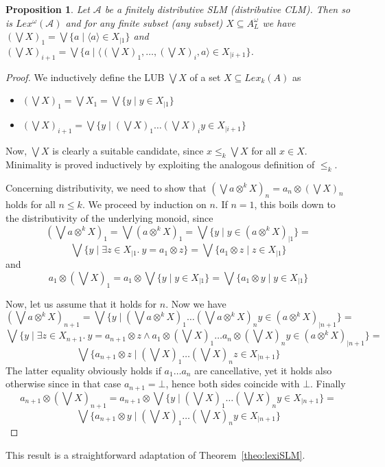\documentclass[a4paper]{elsarticle}
\newtheorem{proposition}{Proposition}
\newcommand{\1}{\mathbf{1}}
\begin{document}
\begin{proposition}\label{prop:lexiSLM}
	Let $\mathcal{A}$ be a finitely distributive SLM (distributive CLM).
	Then so is $Lex^\omega(\mathcal{A})$
	and for any finite subset (any subset) $X \subseteq A^\omega_L$ 
         we have $(\bigvee X)_1 = \bigvee \{ a \mid \langle a \rangle \in X_{\mid 1}\}$
         and $(\bigvee X)_{i+1} = \bigvee \{ a \mid \langle (\bigvee X)_1, \ldots, (\bigvee X)_i, a \rangle \in X_{\mid i+1}\}$.
\end{proposition}
\begin{proof}
	
	We inductively define the LUB $\bigvee X$ of a set $X \subseteq Lex_k(A)$ as
	\begin{itemize}
		\item $(\bigvee X)_1 = \bigvee X_1 = \bigvee \{ y \mid y \in X_{\mid 1}\}$
		\item $(\bigvee X)_{i+1} = \bigvee \{ y \mid (\bigvee X)_1 \ldots (\bigvee X)_i y \in X_{\mid i+1}\}$
	\end{itemize}
	
	Now, $\bigvee X$ is clearly a suitable candidate, since $x \leq_k \bigvee X$ for all 
	$x \in X$. Minimality is proved inductively by exploiting the analogous 
	definition of $\leq_k$.
	
	Concerning distributivity, we need to show that
	$(\bigvee a \otimes^k X)_n = a_n \otimes (\bigvee X)_n$ holds for all $n \leq k$.
	We proceed by induction on $n$. If $n = 1$, this boils down to the distributivity of 
	the underlying monoid, since
	$$(\bigvee a \otimes^k X)_1 = \bigvee (a \otimes^k X)_1 = \bigvee \{ y \mid y \in (a \otimes^k X)_{\mid 1}\} =$$
	$$\bigvee \{ y \mid \exists z \in X_{\mid 1}.\ y = a_1 \otimes z\} = \bigvee \{ a_1 \otimes z \mid z \in X_{\mid 1}\}$$
	and 
	$$ a_1 \otimes (\bigvee X)_1 = a_1 \otimes \bigvee \{ y \mid y \in X_{\mid 1}\}  = \bigvee \{ a_1 \otimes y \mid y \in X_{\mid 1}\}$$
	
	Now, let us assume that it holds for $n$. Now we have 
	$$(\bigvee a \otimes^k X)_{n+1} = \bigvee \{ y \mid (\bigvee a \otimes^k X)_1 \ldots (\bigvee a \otimes^k X)_n y \in (a \otimes^k X)_{\mid n+1}\} =$$
	$$ \bigvee \{ y \mid \exists z \in X_{n+1}.\ y = a_{n+1} \otimes z \wedge a_1 \otimes (\bigvee X)_1 \ldots a_n \otimes (\bigvee X)_n y \in (a \otimes^k X)_{\mid n+1}\} =$$
	$$ \bigvee \{ a_{n+1} \otimes z \mid (\bigvee X)_1 \ldots (\bigvee X)_n z \in X_{\mid n+1}\}$$
	The latter equality obviously holds if $a_1 \ldots a_n$ are cancellative, yet it holds also otherwise since in that case 
	$a_{n+1} = \bot$, hence both sides coincide with $\bot$. Finally
	$$a_{n+1} \otimes (\bigvee X)_{n+1} = a_{n+1} \otimes \bigvee \{ y \mid (\bigvee X)_1 \ldots (\bigvee X)_n y \in X_{\mid n+1}\}  =$$
	$$ \bigvee \{ a_{n+1} \otimes y \mid (\bigvee X)_1 \ldots (\bigvee X)_n y \in X_{\mid n+1}\}$$
\end{proof}
This result is a straightforward adaptation of Theorem~\ref{theo:lexiSLM}.
\end{document}

